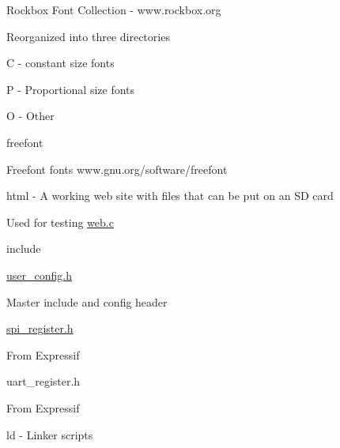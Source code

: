 \begin{DoxyItemize}
\begin{DoxyItemize}
\item Rockbox Font Collection -\/ www.\+rockbox.\+org
\item Reorganized into three directories
\begin{DoxyItemize}
\item C -\/ constant size fonts
\item P -\/ Proportional size fonts
\item O -\/ Other
\end{DoxyItemize}
\end{DoxyItemize}
\item freefont
\begin{DoxyItemize}
\item Freefont fonts www.\+gnu.\+org/software/freefont
\end{DoxyItemize}
\end{DoxyItemize}

html -\/ A working web site with files that can be put on an SD card
\begin{DoxyItemize}
\item Used for testing \hyperlink{web_8c}{web.\+c}
\end{DoxyItemize}

include
\begin{DoxyItemize}
\item \hyperlink{user__config_8h}{user\+\_\+config.\+h}
\begin{DoxyItemize}
\item Master include and config header
\end{DoxyItemize}
\item \hyperlink{spi__register_8h}{spi\+\_\+register.\+h}
\begin{DoxyItemize}
\item From Expressif
\end{DoxyItemize}
\item uart\+\_\+register.\+h
\begin{DoxyItemize}
\item From Expressif
\end{DoxyItemize}
\end{DoxyItemize}

ld -\/ Linker scripts


